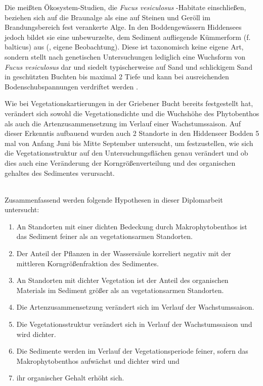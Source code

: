 Die meißten Ökosystem-Studien, die \textit{Fucus vesiculosus} -Habitate einschließen, beziehen sich auf die Braunalge als eine auf Steinen und Geröll im Brandungsbereich fest verankerte Alge.
In den Boddengewässern Hiddensees jedoch bildet sie eine unbewurzelte, dem Sediment aufliegende Kümmerform (f. balticus) aus (\cite{kunzenbach_1955, muller-stoll_1961, flugge_2004}, eigene Beobachtung).  Diese ist taxonomisch keine eigene Art, sondern stellt nach genetischen Untersuchungen lediglich eine Wuchsform von \textit{Fucus vesiculosus} dar \citep{athanasiadis_1996} und siedelt typischerweise auf Sand und schlickigem Sand in geschützten Buchten bis maximal \unit{2}{\metre} Tiefe \citep{helcom_red_list_macrophyte_expert_group_2013} und kann bei ausreichenden Bodenschubspannungen verdriftet werden \citep{canal-verges_2010}.

Wie \cite{flugge_2004} bei Vegetationskartierungen in der Griebener Bucht bereits festgestellt hat, verändert sich sowohl die Vegetationsdichte und die Wuchshöhe des Phytobenthos als auch die Artenzusammensetzung im Verlauf einer Wachstumssaison. Auf dieser Erkenntis aufbauend wurden auch 2 Standorte in den Hiddenseer Bodden 5 mal von Anfang Juni bis Mitte September untersucht, um festzustellen, wie sich die Vegetationsstruktur auf den Untersuchungsflächen genau verändert und ob dies auch eine Veränderung der Korngrößenverteilung und des organischen gehaltes des Sedimentes verursacht.

\\
Zusammenfassend werden folgende Hypothesen in dieser Diplomarbeit untersucht: 
\\
\begin{enumerate}[label=\Roman{*},leftmargin=1.5cm]
\item An Standorten mit einer dichten Bedeckung durch Makrophytobenthos ist das Sediment feiner als an vegetationsarmen Standorten.
\item Der Anteil der Pflanzen in der Wassersäule korreliert negativ mit der mittleren Korngrößenfraktion des Sedimentes.
\item An Standorten mit dichter Vegetation ist der Anteil des organischen Materials im Sediment größer als an vegetationsarmen Standorten.
\item Die Artenzusammensetzung verändert sich im Verlauf der Wachstumssaison.
\item Die Vegetationsstruktur verändert sich in Verlauf der Wachstumssaison und wird dichter.
\item Die Sedimente werden im Verlauf der Vegetationsperiode feiner, sofern das Makrophytobenthos aufwächst und dichter wird und 
\item ihr organischer Gehalt erhöht sich.
\end{enumerate}
